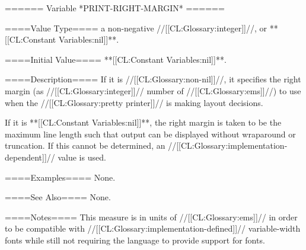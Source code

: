 ====== Variable *PRINT-RIGHT-MARGIN* ======

====Value Type====
a non-negative //[[CL:Glossary:integer]]//, or **[[CL:Constant Variables:nil]]**.

====Initial Value====
**[[CL:Constant Variables:nil]]**.

====Description====
If it is //[[CL:Glossary:non-nil]]//, it specifies the right margin (as //[[CL:Glossary:integer]]// number of //[[CL:Glossary:ems]]//) to use when the //[[CL:Glossary:pretty printer]]// is making layout decisions.

If it is **[[CL:Constant Variables:nil]]**, the right margin is taken to be the maximum line length such that output can be displayed without wraparound or truncation. If this cannot be determined, an //[[CL:Glossary:implementation-dependent]]// value is used.

====Examples====
None.

====See Also====
None.

====Notes====
This measure is in units of //[[CL:Glossary:ems]]// in order to be compatible with //[[CL:Glossary:implementation-defined]]// variable-width fonts while still not requiring the language to provide support for fonts.

